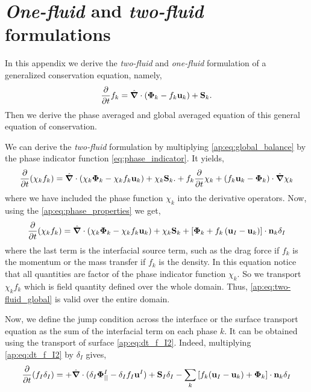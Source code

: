\section{\textit{One-fluid} and \textit{two-fluid} formulations}
In this appendix we derive the \textit{two-fluid} and \textit{one-fluid} formulation of a generalized conservation equation, namely,
\begin{equation}
    \frac{\partial}{\partial t} f_k
    = \hat{\bm{\nabla}} \cdot (\bm{\Phi}_k - f_k\textbf{u}_k)
    + \textbf{S}_k.
    \label{ap:eq:global_balance}
\end{equation}
Then we derive the phase averaged and global averaged equation of this general equation of conservation. 

We can derive the \textit{two-fluid} formulation by multiplying \ref{ap:eq:global_balance} by the phase indicator function \ref{eq:phase_indicator}. 
It yields, 
\begin{equation*}
    \frac{\partial}{\partial t} (\chi_k f_k)
    = \hat{\bm{\nabla}} \cdot (\chi_k \bm{\Phi}_k - \chi_k f_k \textbf{u}_k)
    + \chi_k \textbf{S}_k.
    + f_k \frac{\partial}{\partial t} \chi_k
    + \left(
        f_k \textbf{u}_k 
        - \bm{\Phi}_k
    \right) \cdot \hat{\bm{\nabla}} \chi_k
\end{equation*}
where we have included the phase function $\chi_k$ into the derivative operators. 
Now, using the \ref{ap:eq:phase_properties} we get, 
\begin{equation}
    \frac{\partial}{\partial t} (\chi_k f_k)
    = \hat{\bm{\nabla}} \cdot (\chi_k \bm{\Phi}_k - \chi_k f_k \textbf{u}_k)
    + \chi_k \textbf{S}_k
    + \left[
        \bm{\Phi}_k 
        + f_k 
        \left(
            \textbf{u}_I
            - \textbf{u}_k
        \right) 
    \right]
    \cdot \textbf{n}_k \delta_I 
    \label{ap:eq:two-fluid_global}
\end{equation}
where the last term is the interfacial source term, such as the drag force if $f_k$ is the momentum or the mass transfer if $f_k$ is the density. 
In this equation notice that all quantities are factor of the phase indicator function $\chi_k$. 
So we transport $\chi_k f_k$ which is field quantity defined over the whole domain. 
Thus, \ref{ap:eq:two-fluid_global} is valid over the entire domain.   

Now, we define the jump condition across the interface or the surface transport equation as the sum of the interfacial term on each phase $k$. 
It can be obtained using  the transport of surface \ref{ap:eq:dt_f_I2}.
Indeed, multiplying \ref{ap:eq:dt_f_I2} by $\delta_I$ gives, 
\begin{equation}
    \frac{\partial}{\partial t} (f_I\delta_I)  
    = 
    + \hat{\bm{\nabla}} \cdot (\delta_I \mathbf{\Phi}^I_{||} - \delta_I f_I \textbf{u}^I)
    +\textbf{S}_I \delta_I
    - \sum_k \left[
    f_k (\textbf{u}_I - \textbf{u}_k)
    + \mathbf{\Phi}_k
    \right] \cdot \textbf{n}_k \delta_I
    \label{ap:eq:general_jump}
\end{equation}

